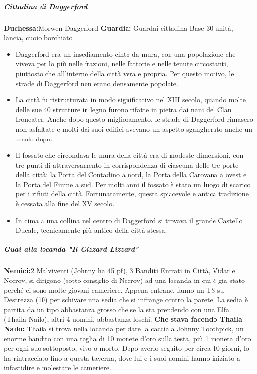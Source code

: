 \documentclass{article}
\begin{document}
            \subparagraph{Cittadina di Daggerford}
                	\textbf{Duchessa:}Morwen Daggerford
                    \textbf{Guardia:} Guardai cittadina Base 30 unità, lancia, cuoio borchiato
            \begin{itemize}
                \item Daggerford era un insediamento cinto da mura, con una popolazione che viveva per lo più nelle frazioni, nelle fattorie e nelle tenute circostanti, piuttosto che all'interno della città vera e propria. Per questo motivo, le strade di Daggerford non erano densamente popolate.
                
                \item La città fu ristrutturata in modo significativo nel XIII secolo, quando molte delle sue 40 strutture in legno furono rifatte in pietra dai nani del Clan Ironeater. Anche dopo questo miglioramento, le strade di Daggerford rimasero non asfaltate e molti dei suoi edifici avevano un aspetto sgangherato anche un secolo dopo.
                
                \item Il fossato che circondava le mura della città era di modeste dimensioni, con tre punti di attraversamento in corrispondenza di ciascuna delle tre porte della città: la Porta del Contadino a nord, la Porta della Carovana a ovest e la Porta del Fiume a sud. Per molti anni il fossato è stato un luogo di scarico per i rifiuti della città. Fortunatamente, questa spiacevole e antica tradizione è cessata alla fine del XV secolo.
                
                \item In cima a una collina nel centro di Daggerford si trovava il grande Castello Ducale, tecnicamente più antico della città stessa.
            \end{itemize}

            \subparagraph{Guai alla locanda "Il Gizzard Lizzard" }
            \textbf{Nemici:}2 Malviventi (Johnny ha 45 pf), 3 Banditi
            Entrati in Città, Vidar e Necrov, si dirigono (sotto consiglio di Necrov) ad una locanda in cui è gia stato perché ci sono molte giovani cameriere. Appena entrane, fanno un TS su Destrezza (10) per schivare una sedia che si infrange contro la parete. La sedia è partita da un tipo abbastanza grosso che se la sta prendendo con una Elfa (Thaila Nailo), altri 4 uomini, abbastanza loschi. 
            \textbf{Che stava facendo Thaila Nailo:} Thaila si trova nella locanda per dare la caccia a Johnny Toothpick, un enorme bandito con una taglia di 10 monete d'oro sulla testa, più 1 moneta d'oro per ogni suo sottoposto, vivo o morto. Dopo averlo seguito per circa 10 giorni, lo ha rintracciato fino a questa taverna, dove lui e i suoi uomini hanno iniziato a infastidire e molestare le cameriere.
           
\end{document}

